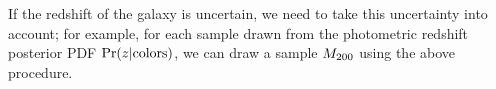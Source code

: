 \documentclass[useAMS,usenatbib]{mn2e}
\begin{document}
If the redshift of the galaxy is uncertain, we need to take this
uncertainty into account; for example, for each sample drawn from the
photometric redshift posterior PDF $\Pr(z|{\rm colors})$, we can draw a
sample $M_{200}$ using the above procedure.



% 

% 
% 




\label{lastpage}
\bsp
\end{document}
